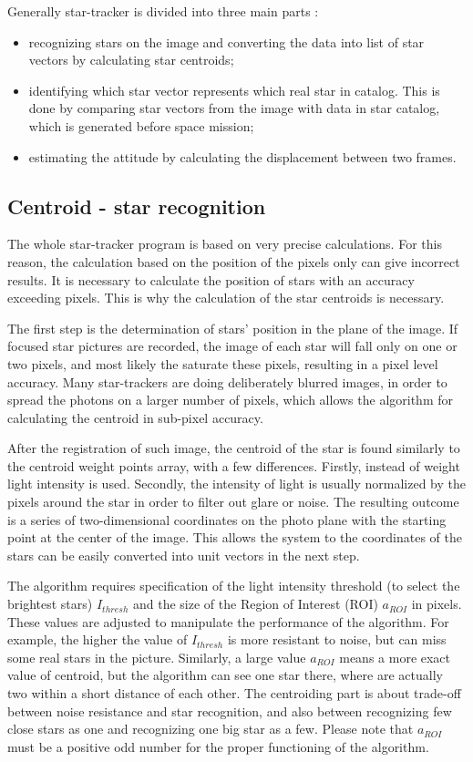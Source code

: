 \documentclass[12pt,a4paper,twoside]{article}
\begin{document}
Generally star-tracker is divided into three main parts \cite{mcbryde2012star}:
\begin{itemize}
\item recognizing stars on the image and converting the data into list of star vectors by calculating star centroids;
\item identifying which star vector represents which real star in catalog. This is done by comparing star vectors from the image with data in star catalog, which is generated before space mission;
\item estimating the attitude by calculating the displacement between two frames.
\end{itemize}

\subsection{Centroid - star recognition}

The whole star-tracker program is based on very precise calculations. For this reason, the calculation based on the position of the pixels only can give incorrect results. It is necessary to calculate the position of stars with an accuracy exceeding pixels. This is why the calculation of the star centroids is necessary.

The first step is the determination of stars' position in the plane of the image. If focused star pictures are recorded, the image of each star will fall only on one or two pixels, and most likely the saturate these pixels, resulting in a pixel level accuracy.
Many star-trackers are doing deliberately blurred images, in order to spread the photons on a larger number of pixels, which allows the algorithm for calculating the centroid in sub-pixel accuracy.

After the registration of such image, the centroid of the star is found similarly to the centroid weight points array, with a few differences. Firstly, instead of weight light intensity is used. Secondly, the intensity of light is usually normalized by the pixels around the star in order to filter out glare or noise. The resulting outcome is a series of two-dimensional coordinates on the photo plane with the starting point at the center of the image. This allows the system to the coordinates of the stars can be easily converted into unit vectors in the next step.

The algorithm requires specification of the light intensity threshold (to select the brightest stars) $I_{thresh}$ and the size of the Region of Interest (ROI) $a_{ROI}$ in pixels. These values are adjusted to manipulate the performance of the algorithm. For example, the higher the value of $I_{thresh}$ is more resistant to noise, but can miss some real stars in the picture. Similarly, a large value $a_{ROI}$ means a more exact value of centroid, but the algorithm can see one star there, where are actually two within a short distance of each other. The centroiding part is about trade-off between noise resistance and star recognition, and also between recognizing few close stars as one and recognizing one big star as a few.
Please note that $a_{ROI}$ must be a positive odd number for the proper functioning of the algorithm.
\end{document}

